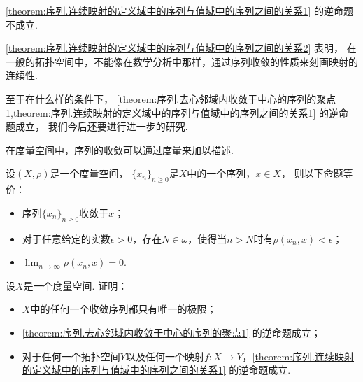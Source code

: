 \begin{proposition}\label{theorem:序列.连续映射的定义域中的序列与值域中的序列之间的关系2}
\cref{theorem:序列.连续映射的定义域中的序列与值域中的序列之间的关系1} 的逆命题不成立.
\end{proposition}

\cref{theorem:序列.连续映射的定义域中的序列与值域中的序列之间的关系2} 表明，
在一般的拓扑空间中，不能像在数学分析中那样，通过序列收敛的性质来刻画映射的连续性.

至于在什么样的条件下，
\cref{theorem:序列.去心邻域内收敛于中心的序列的聚点1,theorem:序列.连续映射的定义域中的序列与值域中的序列之间的关系1} 的逆命题成立，
我们今后还要进行进一步的研究.

在度量空间中，序列的收敛可以通过度量来加以描述.
\begin{theorem}\label{theorem:序列.度量空间中的收敛序列}
设\((X,\rho)\)是一个度量空间，
\(\{x_n\}_{n\geq0}\)是\(X\)中的一个序列，\(x \in X\)，
则以下命题等价：\begin{itemize}
	\item 序列\(\{x_n\}_{n\geq0}\)收敛于\(x\)；
	\item 对于任意给定的实数\(\epsilon>0\)，存在\(N\in\omega\)，使得当\(n>N\)时有\(\rho(x_n,x)<\epsilon\)；
	\item \(\lim_{n\to\infty} \rho(x_n,x) = 0\).
\end{itemize}
\end{theorem}

\begin{example}
设\(X\)是一个度量空间.
证明：\begin{itemize}
	\item \(X\)中的任何一个收敛序列都只有唯一的极限；
	\item \cref{theorem:序列.去心邻域内收敛于中心的序列的聚点1} 的逆命题成立；
	\item 对于任何一个拓扑空间\(Y\)以及任何一个映射\(f\colon X \to Y\)，\cref{theorem:序列.连续映射的定义域中的序列与值域中的序列之间的关系1} 的逆命题成立.
\end{itemize}
\end{example}
